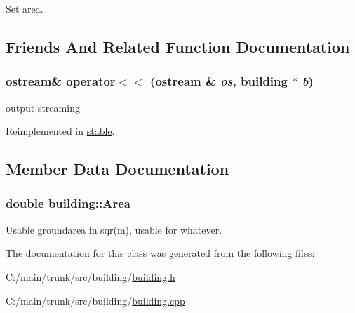 Set area. 

\subsection{Friends And Related Function Documentation}
\hypertarget{classbuilding_a47f4f2ec998d1300d4ccd788b0a668ca}{
\subsubsection[{operator$<$$<$}]{\setlength{\rightskip}{0pt plus 5cm}ostream\& operator$<$$<$ (ostream \& {\em os}, \/  {\bf building} $\ast$ {\em b})}}
\label{classbuilding_a47f4f2ec998d1300d4ccd788b0a668ca}


output streaming 

Reimplemented in \hyperlink{classstable_a3372b8131ba5e161ddda6baf3b22d81d}{stable}.

\subsection{Member Data Documentation}
\hypertarget{classbuilding_aa68e50d312e05ff1e342393d21c9f3cb}{
\subsubsection[{Area}]{\setlength{\rightskip}{0pt plus 5cm}double {\bf building::Area}}}
\label{classbuilding_aa68e50d312e05ff1e342393d21c9f3cb}


Usable groundarea in sqr(m), usable for whatever. 

The documentation for this class was generated from the following files:\begin{DoxyCompactItemize}
\item 
C:/main/trunk/src/building/\hyperlink{building_8h}{building.h}\item 
C:/main/trunk/src/building/\hyperlink{building_8cpp}{building.cpp}\end{DoxyCompactItemize}
